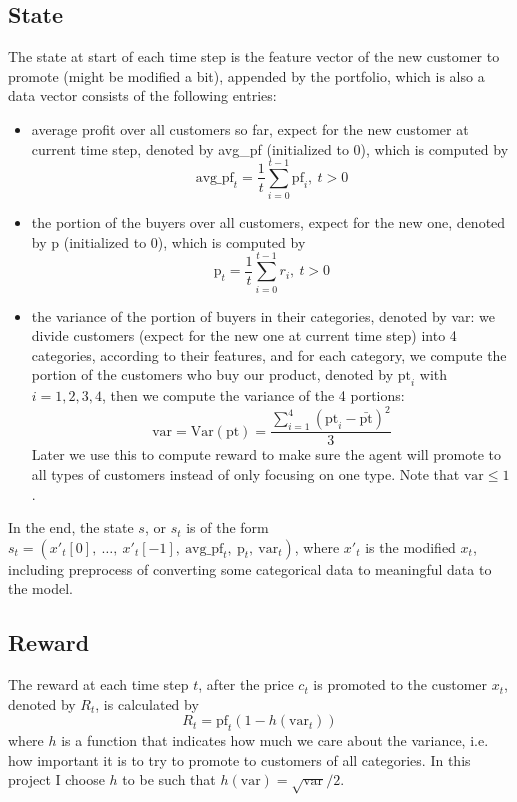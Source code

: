 \documentclass[11pt]{article}
\begin{document}
\subsection{State}
The state at start of each time step is the feature vector of the new customer 
to promote (might be modified a bit), appended by the portfolio, which is also 
a data vector consists of the following entries:
\begin{itemize}
    \item average profit over all customers so far, expect for the new customer
        at current time step, denoted by avg\_pf (initialized to \(0\)), 
        which is computed by
        \[\text{avg\_pf}_t = \frac{1}{t}\sum_{i=0}^{t-1} \text{pf}_i, \:t>0\]
    \item the portion of the buyers over all customers, expect for the new one,
        denoted by p (initialized to 0), which is computed by
        \[\text{p}_t=\frac{1}{t}\sum_{i=0}^{t-1} r_i, \:t>0\]
    \item the variance of the portion of buyers in their categories, denoted 
        by var: we divide customers (expect for the new one at current time 
        step) into 4 categories, according to their features, and for each 
        category, we compute the portion of the customers who buy our product,
        denoted by \(\text{pt}_i\) with \(i=1, 2, 3, 4\), then we compute the 
        variance of the 4 portions:
        \[\text{var}=\text{Var}(\text{pt})=\frac{\sum_{i=1}^{4} 
        \left(\text{pt}_i-\bar{\text{pt}}\right)^2}{3}\]
        Later we use this to compute reward to 
        make sure the agent will promote to all types of customers instead of 
        only focusing on one type.
        \vspace{2mm}\newline Note that \(\text{var}\leq1\).
\end{itemize}
In the end, the state \(s\), or \(s_t\) is of the form 
\(s_t=(x'_t[0],\:\dots,\:x'_t[-1],\:\text{avg\_pf}_t,\:\text{p}_t,
\:\text{var}_t)\), where \(x'_t\) is the modified \(x_t\), including preprocess
of converting some categorical data to meaningful data to the model.

\subsection{Reward}
The reward at each time step \(t\), after the price \(c_t\) is promoted to the 
customer \(x_t\), denoted by \(R_t\), is calculated by
\[R_t = \text{pf}_t\left(1-h(\text{var}_t)\right)\]
where \(h\) is a function that indicates how much we care about the variance,
i.e. how important it is to try to promote to customers of all categories. In
this project I choose \(h\) to be such that 
\(h(\text{var}) = \sqrt{\text{var}}/2\).
\end{document}
